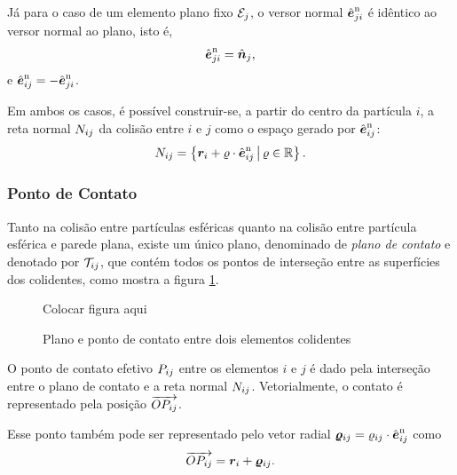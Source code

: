 Já para o caso de um elemento plano fixo \({\mathcal{E}}_{j}\), o versor normal \({\hat{\bm{e}}}_{j i}^{\text{n}}\) é idêntico ao versor normal ao plano, isto é,
\begin{equation*}
	{\hat{\bm{e}}}_{j i}^{\text{n}} = {\hat{\bm{n}}}_{j},
\end{equation*}
e \({\hat{\bm{e}}}_{i j}^{\text{n}} = - {\hat{\bm{e}}}_{j i}^{\text{n}}\).

Em ambos os casos, é possível construir-se, a partir do centro da partícula \(i\), a reta normal \({N}_{i j}\) da colisão entre \(i\) e \(j\) como o espaço gerado por \({\hat{\bm{e}}}_{i j}^{\text{n}}\):
\begin{equation*}
	{N}_{i j} = \left\lbrace {\bm{r}}_{i} + \varrho\cdot{\hat{\bm{e}}}_{i j}^{\text{n}}\,\middle|\,\varrho\in\mathbb{R} \right\rbrace.
\end{equation*}

\subsubsection*{Ponto de Contato}

Tanto na colisão entre partículas esféricas quanto na colisão entre partícula esférica e parede plana, existe um único plano, denominado de \textit{plano de contato} e denotado por \({\mathcal{T}}_{i j}\), que contém todos os pontos de interseção entre as superfícies dos colidentes, como mostra a figura \ref{fig:contact_point}.

\begin{figure}[h]
	\caption{Plano e ponto de contato entre dois elementos colidentes}
	\begin{center}
		\alert{Colocar figura aqui}
	\end{center}
	\label{fig:contact_point}
\end{figure}

O ponto de contato efetivo \({P}_{i j}\) entre os elementos \(i\) e \(j\) é dado pela interseção entre o plano de contato e a reta normal \({N}_{i j}\). Vetorialmente, o contato é representado pela posição \(\overrightarrow{O {P}_{i j}}\).

Esse ponto também pode ser representado pelo vetor radial \({\bm{\varrho}}_{i j} = {\varrho}_{i j}\cdot{\hat{\bm{e}}}_{i j}^{\text{n}}\) como
\begin{equation} \label{eq:contact_point}
	\overrightarrow{O {P}_{i j}} = {\bm{r}}_{i} + {\bm{\varrho}}_{i j}.
\end{equation}

